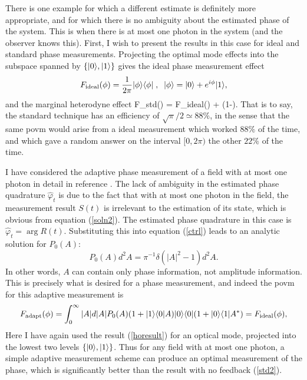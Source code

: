 There is one example for which a different estimate is definitely more
appropriate, and for which there is no ambiguity about the estimated phase of the
system. This is when there is at most one photon in the system (and the observer
knows this).  First, I wish to present the results in this case for ideal and
standard phase measurements. Projecting the optimal mode effects into the subspace
spanned by $\{| {0} \rangle,| {1} \rangle\}$ gives the ideal phase measurement effect
\begin{equation} {F}_{\rm ideal}(\phi) = \frac{1}{2\pi} |{\phi}\rangle\langle{\phi}|
\; , \;\;  |{\phi}\rangle =
|{0}\rangle + e^{i\phi}|{1}\rangle, \end{equation}
and the marginal heterodyne effect
\beq
F_{\rm std}(\phi) =  
{F}_{\rm ideal}(\phi) + \left(1-\right). 
\label{std2}
\eeq
That is to say, the standard technique has an efficiency of $\sqrt{\pi}/2 \simeq
88\%$, in the sense that the same {\sc povm} would arise from a ideal measurement
which worked $88\%$ of the time, and which gave a random answer on the interval
$[0,2\pi)$ the other $22\%$ of the time. 

I have considered the adaptive phase measurement of a field with at most one photon
in detail in reference \cite{Wis95prl}. The lack of ambiguity in the estimated
phase quadrature $\hat\varphi_t$ is due to the fact that with at most one photon
in the field, the measurement result $S(t)$ is irrelevant to the
estimation of its state, which is obvious from equation (\ref{soln2}). The estimated
phase quadrature in this case is $\hat\varphi_t = \arg R(t)$. Substituting this
into equation (\ref{ctrl}) leads to an analytic solution for $P_0(A)$:
\begin{equation}
P_0(A)d^2A = \pi^{-1} \delta(|A|^2 - 1)d^2A.
\end{equation}
In other words, $A$ can contain only phase information, not amplitude information.
This is precisely what is desired for a phase measurement, and indeed the {\sc povm} for
this adaptive measurement is \begin{equation}
{F}_{\rm adapt}(\phi) = \int_0^\infty |A| d|A|
P_0(A) (1+| {1} \rangle\langle {0} | A) | {0} \rangle\langle {0} | (1+| {0} \rangle\langle {1} | A^*) = {F}_{\rm ideal}(\phi),
\end{equation} Here I have again used the result (\ref{horesult}) for an optical
mode, projected into the lowest two levels $\{| {0} \rangle,| {1} \rangle\}$. Thus for any
field with at most one photon,  a simple adaptive measurement scheme can produce an
optimal measurement of the phase, which is significantly better than the result
with no feedback (\ref{std2}).


